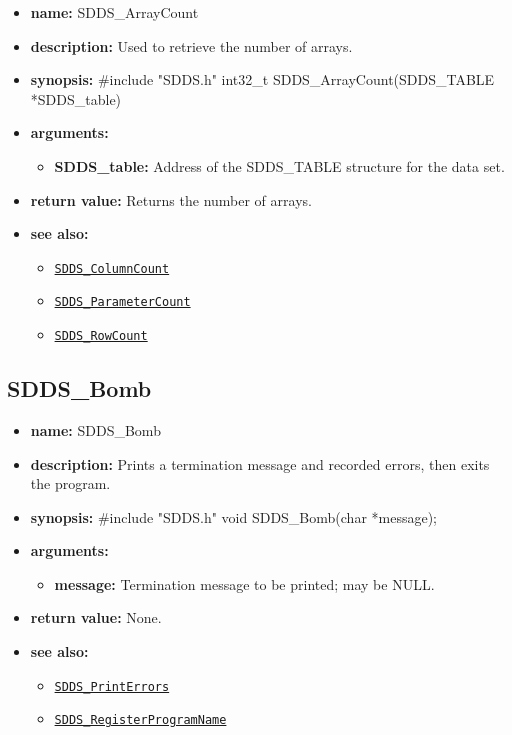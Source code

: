 \documentclass[11pt]{article}
\newcommand{\progref}[1]{\hyperref[SDDS_#1]{\tt SDDS\_#1}}
\begin{document}
\begin{itemize}
\item {\bf name:}\newline
SDDS\_ArrayCount
\item {\bf description:}\newline
Used to retrieve the number of arrays.
\item {\bf synopsis:} \#include "SDDS.h"\newline
int32\_t SDDS\_ArrayCount(SDDS\_TABLE *SDDS\_table)
\item {\bf arguments:}
\begin{itemize}
\item {\bf SDDS\_table:} Address of the SDDS\_TABLE structure for the data set.
\end{itemize}
\item {\bf return value:}\newline
Returns the number of arrays.
\item {\bf see also:}
\begin{itemize}
\item \progref{ColumnCount}
\item \progref{ParameterCount}
\item \progref{RowCount}
\end{itemize}
\end{itemize}

\subsection{SDDS\_Bomb}
\label{SDDS_Bomb}

\begin{itemize}
\item {\bf name:}\newline
SDDS\_Bomb
\item {\bf description:}\newline
Prints a termination message and recorded errors, then exits the program.
\item {\bf synopsis:} \#include "SDDS.h"\newline
void SDDS\_Bomb(char *message);
\item {\bf arguments:}
\begin{itemize}
\item {\bf message:} Termination message to be printed; may be NULL.
\end{itemize}
\item {\bf return value:}\newline
None.
\item {\bf see also:}
\begin{itemize}
\item \progref{PrintErrors}
\item \progref{RegisterProgramName}
\end{itemize}
\end{itemize}
\end{document}
